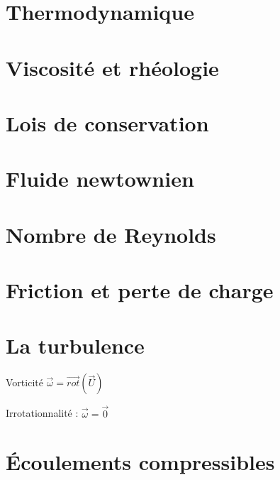 \documentclass[10pt,a4paper,twocolumn,fleqn]{article}
\begin{document}
\section{Thermodynamique}


\section{Viscosité et rhéologie}\label{sec:rheo}


\section{Lois de conservation}


\section{Fluide newtownien}


\section{Nombre de Reynolds} %


\section{Friction et perte de charge} %


\section{La turbulence}
Vorticité $\vec{\omega}=\vec{rot}(\vec{U})$

Irrotationnalité : $\vec{\omega}=\vec{0}$


\section{Écoulements compressibles}
\end{document}
